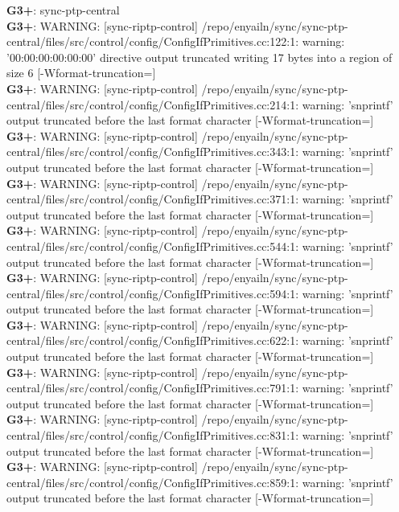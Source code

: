\documentclass[12pt,twoside]{article}
\begin{document}
\textbf{G3+}: sync-ptp-central\\ 
\textbf{G3+}: WARNING: [sync-riptp-control] /repo/enyailn/sync/sync-ptp-central/files/src/control/config/ConfigIfPrimitives.cc:122:1: warning: '00:00:00:00:00:00' directive output truncated writing 17 bytes into a region of size 6 [-Wformat-truncation=]\\ 
\textbf{G3+}: WARNING: [sync-riptp-control] /repo/enyailn/sync/sync-ptp-central/files/src/control/config/ConfigIfPrimitives.cc:214:1: warning: 'snprintf' output truncated before the last format character [-Wformat-truncation=]\\ 
\textbf{G3+}: WARNING: [sync-riptp-control] /repo/enyailn/sync/sync-ptp-central/files/src/control/config/ConfigIfPrimitives.cc:343:1: warning: 'snprintf' output truncated before the last format character [-Wformat-truncation=]\\ 
\textbf{G3+}: WARNING: [sync-riptp-control] /repo/enyailn/sync/sync-ptp-central/files/src/control/config/ConfigIfPrimitives.cc:371:1: warning: 'snprintf' output truncated before the last format character [-Wformat-truncation=]\\ 
\textbf{G3+}: WARNING: [sync-riptp-control] /repo/enyailn/sync/sync-ptp-central/files/src/control/config/ConfigIfPrimitives.cc:544:1: warning: 'snprintf' output truncated before the last format character [-Wformat-truncation=]\\ 
\textbf{G3+}: WARNING: [sync-riptp-control] /repo/enyailn/sync/sync-ptp-central/files/src/control/config/ConfigIfPrimitives.cc:594:1: warning: 'snprintf' output truncated before the last format character [-Wformat-truncation=]\\ 
\textbf{G3+}: WARNING: [sync-riptp-control] /repo/enyailn/sync/sync-ptp-central/files/src/control/config/ConfigIfPrimitives.cc:622:1: warning: 'snprintf' output truncated before the last format character [-Wformat-truncation=]\\ 
\textbf{G3+}: WARNING: [sync-riptp-control] /repo/enyailn/sync/sync-ptp-central/files/src/control/config/ConfigIfPrimitives.cc:791:1: warning: 'snprintf' output truncated before the last format character [-Wformat-truncation=]\\ 
\textbf{G3+}: WARNING: [sync-riptp-control] /repo/enyailn/sync/sync-ptp-central/files/src/control/config/ConfigIfPrimitives.cc:831:1: warning: 'snprintf' output truncated before the last format character [-Wformat-truncation=]\\ 
\textbf{G3+}: WARNING: [sync-riptp-control] /repo/enyailn/sync/sync-ptp-central/files/src/control/config/ConfigIfPrimitives.cc:859:1: warning: 'snprintf' output truncated before the last format character [-Wformat-truncation=]\\ 
\end{document}
